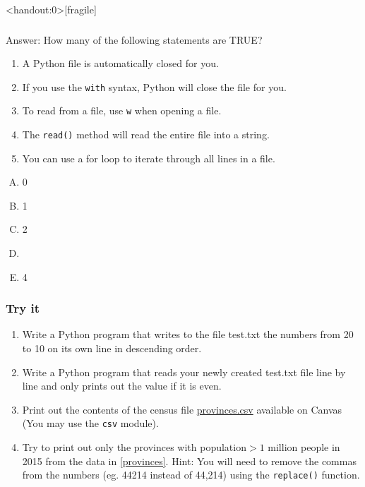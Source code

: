 \documentclass[xcolor=svgnames]{beamer}
\newcommand{\tans}[2]{\textbf<#1>{\textit<#1>{{\color<#1>{iyellow}{#2}}}}}
\newcommand{\ft}[1]{\frametitle{#1}}
\begin{document}
\begin{frame}<handout:0>[fragile]\ft{}
  \begin{block}{Answer:}
How many of the following statements are TRUE?
\begin{enumerate}
\item {	{A Python file is automatically closed for you.
}}
\item {	{If you use the {\tt with} syntax, Python will close the file for you.
}}
\item {	{To read from a file, use {\tt w} when opening a file.
}}
\item {	{The {\tt read()} method will read the entire file into a string.
}} 
\item {	{You can use a for loop to iterate through all lines in a file.}} 
\end{enumerate}
\begin{multicols}{5}
\begin{enumerate}[A)]
\item 0 
\item 1
\item 2
\item \tans{5}{3} 
\item 4
\end{enumerate}
\end{multicols}
  \end{block} 
\end{frame}






\begin{frame}\ft{Try it}
\begin{example}
\begin{enumerate}
\item  Write a Python program that writes to the file test.txt the numbers from 20 to 10 on its own line in descending order.

\item Write a Python program that reads your newly created test.txt file line by line and only prints out the value if it is even.

\item Print out the contents of the census file  \href{https://www150.statcan.gc.ca/t1/tbl1/en/tv.action?pid=1710000501}{provinces.csv} available on Canvas \label{provinces} (You may use the {\tt csv} module).

\item Try to print out only the provinces with population$ > 1 $ million people in 2015 from the data in \ref{provinces}.  Hint: You will need to remove the commas from the numbers (eg. 44214 instead of 44,214) using the {\tt replace()} function.

\end{enumerate}
\end{example}
\end{frame}
\end{document}
